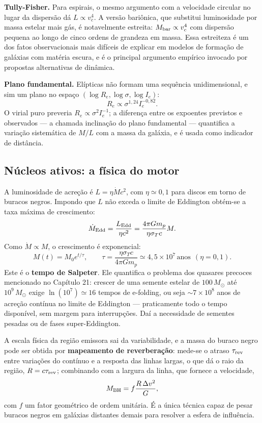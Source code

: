 \documentclass[11pt,a4paper]{article}
\begin{document}
\textbf{Tully-Fisher.} Para espirais, o mesmo argumento com a velocidade circular no lugar da dispersão dá $L\propto v_c^{4}$. A versão bariônica, que substitui luminosidade por massa estelar mais gás, é notavelmente estreita: $M_{\rm bar}\propto v_c^{4}$ com dispersão pequena ao longo de cinco ordens de grandeza em massa. Essa estreiteza é um dos fatos observacionais mais difíceis de explicar em modelos de formação de galáxias com matéria escura, e é o principal argumento empírico invocado por propostas alternativas de dinâmica.

\textbf{Plano fundamental.} Elípticas não formam uma sequência unidimensional, e sim um plano no espaço $(\log R_e,\log\sigma,\log I_e)$:
\[
R_e\propto\sigma^{1{,}24}I_e^{-0{,}82}.
\]
O virial puro preveria $R_e\propto\sigma^{2}I_e^{-1}$; a diferença entre os expoentes previstos e observados --- a chamada inclinação do plano fundamental --- quantifica a variação sistemática de $M/L$ com a massa da galáxia, e é usada como indicador de distância.

\subsection*{Núcleos ativos: a física do motor}

A luminosidade de acreção é $L=\eta\dot{M}c^{2}$, com $\eta\simeq0{,}1$ para discos em torno de buracos negros. Impondo que $L$ não exceda o limite de Eddington obtém-se a taxa máxima de crescimento:
\[
\dot{M}_{\rm Edd}=\frac{L_{\rm Edd}}{\eta c^{2}}=\frac{4\pi Gm_p}{\eta\sigma_Tc}M.
\]
Como $\dot{M}\propto M$, o crescimento é exponencial:
\[
M(t)=M_0e^{t/\tau},
\qquad
\tau=\frac{\eta\sigma_Tc}{4\pi Gm_p}\simeq4{,}5\times10^{7}\,\text{anos}
\ \ (\eta=0{,}1).
\]
Este é o \textbf{tempo de Salpeter}. Ele quantifica o problema dos quasares precoces mencionado no Capítulo 21: crescer de uma semente estelar de $100\,M_\odot$ até $10^{9}\,M_\odot$ exige $\ln(10^{7})\simeq16$ tempos de e-folding, ou seja $\sim7\times10^{8}$ anos de acreção contínua no limite de Eddington --- praticamente todo o tempo disponível, sem margem para interrupções. Daí a necessidade de sementes pesadas ou de fases super-Eddington.

A escala física da região emissora sai da variabilidade, e a massa do buraco negro pode ser obtida por \textbf{mapeamento de reverberação}: mede-se o atraso $\tau_{\rm rev}$ entre variações do contínuo e a resposta das linhas largas, o que dá o raio da região, $R=c\tau_{\rm rev}$; combinando com a largura da linha, que fornece a velocidade,
\[
M_{\rm BH}=f\frac{R\,\Delta v^{2}}{G},
\]
com $f$ um fator geométrico de ordem unitária. É a única técnica capaz de pesar buracos negros em galáxias distantes demais para resolver a esfera de influência.
\end{document}
